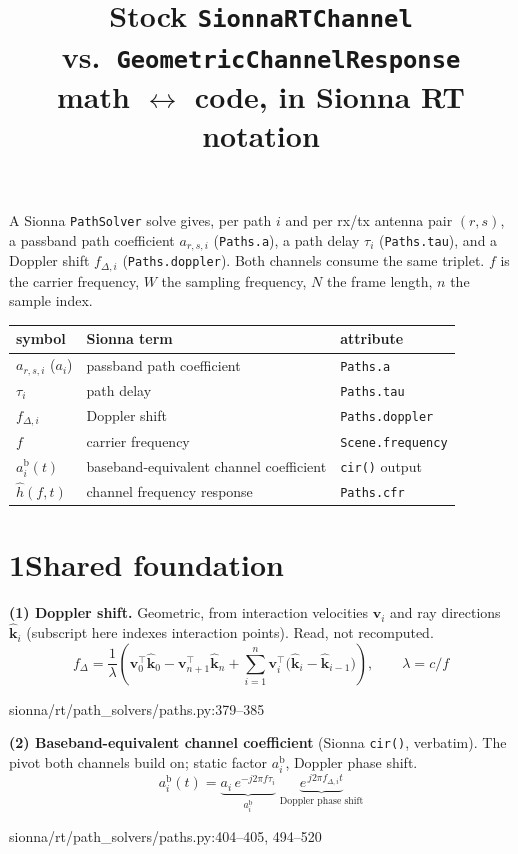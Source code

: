 \documentclass[11pt]{article}
\title{\vspace{-2em}\textbf{Stock \texttt{SionnaRTChannel} vs.\ \texttt{GeometricChannelResponse}}\\[-2pt]
\large math $\leftrightarrow$ code, in Sionna RT notation}
\author{}
\date{}
\newcommand{\ab}{a^{\mathrm{b}}}
\newcommand{\src}[1]{{\footnotesize\ttfamily #1}}
\newcommand{\eqsrc}[1]{\par\vspace{-4pt}\hfill\src{#1}\par\vspace{2pt}}
\begin{document}
\maketitle
\vspace{-3em}

A Sionna \texttt{PathSolver} solve gives, per path $i$ and per rx/tx antenna pair $(r,s)$, a
passband path coefficient $a_{r,s,i}$ (\texttt{Paths.a}), a path delay $\tau_i$ (\texttt{Paths.tau}),
and a Doppler shift $f_{\Delta,i}$ (\texttt{Paths.doppler}). Both channels consume the same triplet.
$f$ is the carrier frequency, $W$ the sampling frequency, $N$ the frame length, $n$ the sample index.

\begin{center}
\begin{tabular}{@{}l l l@{}}
\toprule
symbol & Sionna term & attribute \\
\midrule
$a_{r,s,i}$ ($a_i$) & passband path coefficient & \texttt{Paths.a} \\
$\tau_i$ & path delay & \texttt{Paths.tau} \\
$f_{\Delta,i}$ & Doppler shift & \texttt{Paths.doppler} \\
$f$ & carrier frequency & \texttt{Scene.frequency} \\
$\ab_i(t)$ & baseband-equivalent channel coefficient & \texttt{cir()} output \\
$\hat h(f,t)$ & channel frequency response & \texttt{Paths.cfr} \\
\bottomrule
\end{tabular}
\end{center}

\section*{1\quad Shared foundation}

\textbf{(1) Doppler shift.} Geometric, from interaction velocities $\mathbf{v}_i$ and ray directions
$\hat{\mathbf{k}}_i$ (subscript here indexes interaction points). Read, not recomputed.
\begin{equation}
f_{\Delta} = \frac{1}{\lambda}\!\left(\mathbf{v}_0^{\!\top}\hat{\mathbf{k}}_0
- \mathbf{v}_{n+1}^{\!\top}\hat{\mathbf{k}}_n
+ \sum_{i=1}^{n}\mathbf{v}_i^{\!\top}\!\big(\hat{\mathbf{k}}_i-\hat{\mathbf{k}}_{i-1}\big)\right),
\qquad \lambda = c/f
\end{equation}
\eqsrc{sionna/rt/path\_solvers/paths.py:379--385}

\textbf{(2) Baseband-equivalent channel coefficient} (Sionna \texttt{cir()}, verbatim). The pivot both
channels build on; static factor $\ab_i$, Doppler phase shift.
\begin{equation}
\ab_i(t) = \underbrace{a_i\,e^{-j2\pi f\tau_i}}_{\ab_i}\;
\underbrace{e^{\,j2\pi f_{\Delta,i}t}}_{\text{Doppler phase shift}}
\end{equation}
\eqsrc{sionna/rt/path\_solvers/paths.py:404--405, 494--520}
\end{document}
